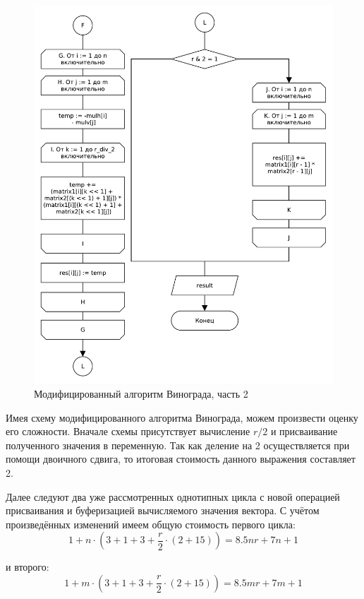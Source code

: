 \begin{figure}[H]
    \centering
    \includegraphics[scale=0.75]{pdf/owinograd-part2.pdf}
    \caption{Модифицированный алгоритм Винограда, часть 2}
\end{figure}

Имея схему модифицированного алгоритма Винограда, можем произвести оценку его сложности. Вначале схемы присутствует вычисление $r/2$ и присваивание полученного значения в переменную. Так как деление на 2 осуществляется при помощи двоичного сдвига, то итоговая стоимость данного выражения составляет 2.

Далее следуют два уже рассмотренных однотипных цикла с новой операцией присваивания и буферизацией вычисляемого значения вектора. С учётом произведённых изменений имеем общую стоимость первого цикла:
\begin{equation}
    1 + n \cdot{} (3 + 1 + 3 + \frac{r}{2} \cdot{} (2 + 15)) = 8.5nr + 7n + 1
\end{equation}

и второго:
\begin{equation}
    1 + m \cdot{} (3 + 1 + 3 + \frac{r}{2} \cdot{} (2 + 15)) = 8.5mr + 7m + 1
\end{equation}

